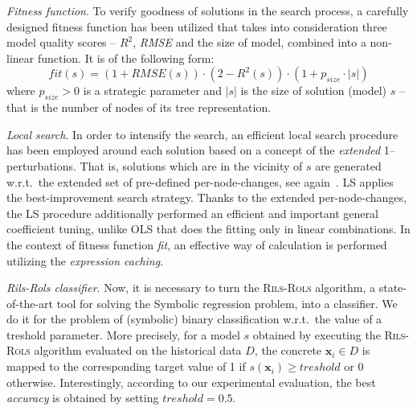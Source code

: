 \documentclass{bmcart}
\begin{document}
 
 \textit{Fitness function}. To verify goodness of solutions in the search process, a carefully designed fitness function has been utilized that takes into consideration three model quality scores -- $R^2$, \emph{RMSE} and the size of model, combined into a non-linear function. It is of the following form:
 \begin{equation}\label{eq:fitness-rils-rols} 
 	 fit(s) = (1+ RMSE(s)) \cdot (2-R^2(s)) \cdot (1+ p_{size} \cdot |s|)
 \end{equation}
where  $p_{size}>0$ is a strategic parameter and $|s|$ is the size of solution (model) $s$ -- that is the number of nodes of its tree representation. 

  \emph{Local search}. In order to intensify the search, an efficient local search procedure has been employed around each solution based on a concept of the \emph{extended} 1--perturbations. That is,   solutions which are in the vicinity of $s$ are generated w.r.t.\ the extended set of pre-defined per-node-changes, see again~\cite{kartelj2023rils}.  LS applies the best-improvement search strategy.  Thanks to the extended  per-node-changes, the LS procedure additionally performed an efficient and  important general coefficient tuning, unlike OLS that does the fitting only in linear combinations.  In the context of fitness function \emph{fit}, an effective way of calculation is performed utilizing the \emph{expression caching}. 
 
 \emph{Rils-Rols classifier}.  Now, it is necessary to turn the \textsc{Rils}-\textsc{Rols} algorithm, a state-of-the-art tool for solving the Symbolic regression problem, into a classifier. We do it for the problem of (symbolic) binary classification w.r.t.\ the value of a treshold parameter. More precisely, for a model $s$ obtained by executing the \textsc{Rils}-\textsc{Rols} algorithm evaluated on the historical data $D$, the concrete $\textbf{x}_i \in D$ is mapped to the corresponding target value of 1 if $s(\textbf{x}_i) \geq treshold$ or 0 otherwise. Interestingly, according to our experimental evaluation, the best \textit{accuracy} is  obtained by setting $treshold=0.5$. 
  
\end{document}
